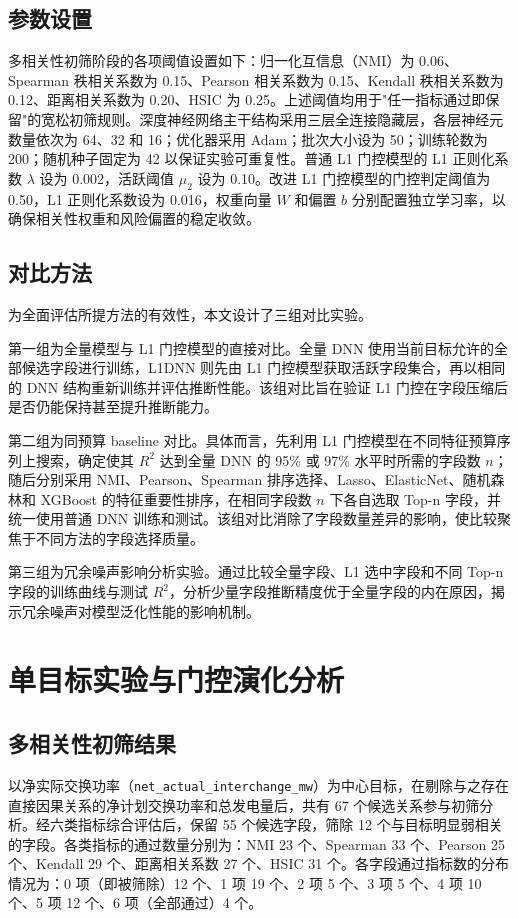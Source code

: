 \documentclass[UTF8,zihao=5,twoside]{ctexart}
\numberwithin{equation}{section}
\newcommand{\code}[1]{\texttt{#1}}
\begin{document}
\subsection{参数设置}
多相关性初筛阶段的各项阈值设置如下：归一化互信息（NMI）为 0.06、Spearman 秩相关系数为 0.15、Pearson 相关系数为 0.15、Kendall 秩相关系数为 0.12、距离相关系数为 0.20、HSIC 为 0.25。上述阈值均用于"任一指标通过即保留"的宽松初筛规则。深度神经网络主干结构采用三层全连接隐藏层，各层神经元数量依次为 64、32 和 16；优化器采用 Adam；批次大小设为 50；训练轮数为 200；随机种子固定为 42 以保证实验可重复性。普通 L1 门控模型的 L1 正则化系数 $\lambda$ 设为 0.002，活跃阈值 $\mu_2$ 设为 0.10。改进 L1 门控模型的门控判定阈值为 0.50，L1 正则化系数设为 0.016，权重向量 $W$ 和偏置 $b$ 分别配置独立学习率，以确保相关性权重和风险偏置的稳定收敛。

\subsection{对比方法}
为全面评估所提方法的有效性，本文设计了三组对比实验。

第一组为全量模型与 L1 门控模型的直接对比。全量 DNN 使用当前目标允许的全部候选字段进行训练，L1DNN 则先由 L1 门控模型获取活跃字段集合，再以相同的 DNN 结构重新训练并评估推断性能。该组对比旨在验证 L1 门控在字段压缩后是否仍能保持甚至提升推断能力。

第二组为同预算 baseline 对比。具体而言，先利用 L1 门控模型在不同特征预算序列上搜索，确定使其 $R^2$ 达到全量 DNN 的 95\% 或 97\% 水平时所需的字段数 $n$；随后分别采用 NMI、Pearson、Spearman 排序选择、Lasso、ElasticNet、随机森林和 XGBoost 的特征重要性排序，在相同字段数 $n$ 下各自选取 Top-n 字段，并统一使用普通 DNN 训练和测试。该组对比消除了字段数量差异的影响，使比较聚焦于不同方法的字段选择质量。

第三组为冗余噪声影响分析实验。通过比较全量字段、L1 选中字段和不同 Top-n 字段的训练曲线与测试 $R^2$，分析少量字段推断精度优于全量字段的内在原因，揭示冗余噪声对模型泛化性能的影响机制。

\section{单目标实验与门控演化分析}
\subsection{多相关性初筛结果}
以净实际交换功率（\code{net\_actual\_interchange\_mw}）为中心目标，在剔除与之存在直接因果关系的净计划交换功率和总发电量后，共有 67 个候选关系参与初筛分析。经六类指标综合评估后，保留 55 个候选字段，筛除 12 个与目标明显弱相关的字段。各类指标的通过数量分别为：NMI 23 个、Spearman 33 个、Pearson 25 个、Kendall 29 个、距离相关系数 27 个、HSIC 31 个。各字段通过指标数的分布情况为：0 项（即被筛除）12 个、1 项 19 个、2 项 5 个、3 项 5 个、4 项 10 个、5 项 12 个、6 项（全部通过）4 个。
\end{document}
